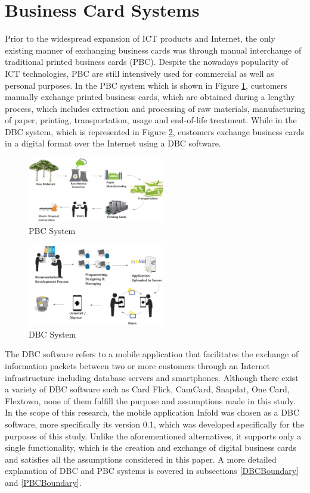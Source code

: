 \documentclass[conference]{IEEEtran}
\begin{document}
\section{Business Card Systems}

Prior to the widespread expansion of ICT products and Internet, the only existing manner of exchanging business cards was through manual interchange of traditional printed business cards (PBC). Despite the nowadays popularity of ICT technologies, PBC are still intensively used for commercial as well as personal purposes. In the PBC system which is shown in Figure \ref{PBCSystem}, customers manually exchange printed business cards, which are obtained during a lengthy process, which includes extraction and processing of raw materials, manufacturing of paper, printing, transportation, usage and end-of-life treatment. While in the DBC system, which is represented in Figure \ref{DBCSystem}, customers exchange business cards in a digital format over the Internet using a DBC software.

\begin{figure}[h]
\centering
\includegraphics[width=6cm]{PBCSystem1.png}
\caption{PBC System}
\label{PBCSystem}
\end{figure}

\begin{figure}[h]
\centering
\includegraphics[width=6cm]{DBCSystem.png}
\caption{DBC System}
\label{DBCSystem}
\end{figure}
The DBC software refers to a mobile application that facilitates the exchange of information packets between two or more customers through an Internet infrastructure including database servers and smartphones. Although there exist a variety of DBC software such as Card Flick, CamCard, Snapdat, One Card, Flextown, none of them fulfill the purpose and assumptions made in this study. In the scope of this research, the mobile application Infold was chosen as a DBC software, more specifically its version 0.1, which was developed specifically for the purposes of this study. Unlike the aforementioned alternatives, it supports only a single functionality, which is the creation and exchange of digital business cards and satisfies all the assumptions considered in this paper. A more detailed explanation of DBC and PBC systems is covered in subsections \ref{DBCBoundary} and \ref{PBCBoundary}.
\end{document}
